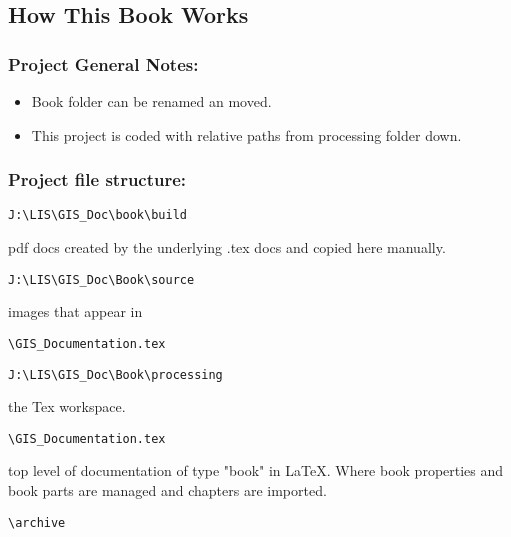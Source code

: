 \documentclass[class=book , crop=false]{standalone}
\begin{document}
\subsection{How This Book Works}
\subsubsection{Project General Notes:}
\begin{itemize}
\item Book folder can be renamed an moved.
\item This project is coded with relative paths from processing folder down.
\end{itemize}
\subsubsection{Project file structure:}
\begin{verbatim}
J:\LIS\GIS_Doc\book\build
\end{verbatim}
\begin{description}
\item pdf docs created by the underlying .tex docs and copied here manually.
\end{description}
\begin{verbatim}
J:\LIS\GIS_Doc\Book\source
\end{verbatim}
\begin{description}
\item images that appear in
\begin{verbatim}
\GIS_Documentation.tex
\end{verbatim}
\end{description}
\begin{verbatim}
J:\LIS\GIS_Doc\Book\processing
\end{verbatim}
\begin{description}
\item the Tex workspace.
\end{description}
\begin{verbatim}
\GIS_Documentation.tex
\end{verbatim}
\begin{description}
\item top level of documentation of type "book" in \LaTeX{}.  Where book properties and book parts are managed and chapters are imported.
\end{description}
\begin{verbatim}
\archive
\end{verbatim}
\end{document}
